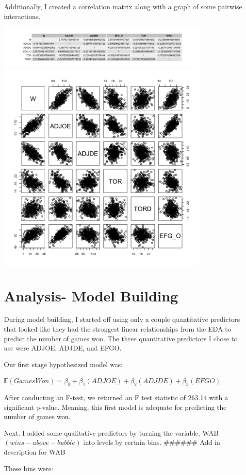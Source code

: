 \documentclass{article}
\begin{document}
Additionally, I created a correlation matrix along with a graph of some pairwise interactions.

\includegraphics[width=0.8\textwidth]{Figures/correlation_matrix.png}\\

\includegraphics[width=0.8\textwidth]{Figures/pairwise_interaction.png}\\


\section{Analysis- Model Building}

During model building, I started off using only a couple quantitative predictors that looked like they had the strongest linear relationships from the EDA to predict the number of games won. The three quantitative predictors I chose to use were ADJOE, ADJDE, and EFGO.

Our first stage hypothesized model was: 

$\mathbb{E}(Games Won) = \beta_{0} + \beta_{1}(ADJOE) + \beta_{2}(ADJDE) + \beta_{3}(EFGO)$ 

After conducting an F-test, we returned an F test statistic of 263.14 with a significant p-value. Meaning, this first model is adequate for predicting the number of games won. 

Next, I added some qualitative predictors by turning the variable, WAB $(wins-above-bubble)$ into levels by certain bins. ###### Add in description for WAB

These bins were: 
\end{document}
